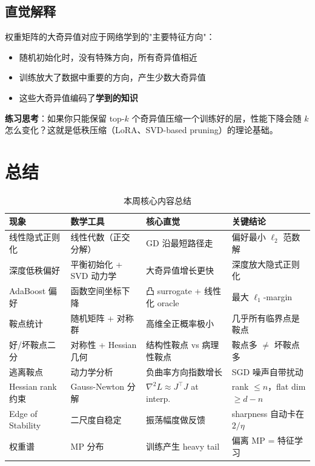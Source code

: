\documentclass[12pt, a4paper]{ctexart}
\begin{document}
\subsection{直觉解释}

\begin{insight}[奇异值与特征学习]
权重矩阵的大奇异值对应于网络学到的"主要特征方向"：

\begin{itemize}
    \item 随机初始化时，没有特殊方向，所有奇异值相近
    \item 训练放大了数据中重要的方向，产生少数大奇异值
    \item 这些大奇异值编码了\textbf{学到的知识}
\end{itemize}

\textbf{练习思考}：如果你只能保留 top-$k$ 个奇异值压缩一个训练好的层，性能下降会随 $k$ 怎么变化？这就是低秩压缩（LoRA、SVD-based pruning）的理论基础。
\end{insight}


\section{总结}

\begin{table}[h]
\centering
\caption{本周核心内容总结}
\begin{tabular}{@{}p{2.8cm}p{3.3cm}p{4cm}p{4cm}@{}}
\toprule
\textbf{现象} & \textbf{数学工具} & \textbf{核心直觉} & \textbf{关键结论} \\ \midrule
线性隐式正则化 & 线性代数（正交分解） & GD 沿最短路径走 & 偏好最小 $\ell_2$ 范数解 \\
深度低秩偏好 & 平衡初始化 + SVD 动力学 & 大奇异值增长更快 & 深度放大隐式正则化 \\
AdaBoost 偏好 & 函数空间坐标下降 & 凸 surrogate + 线性化 oracle & 最大 $\ell_1$-margin \\
鞍点统计 & 随机矩阵 + 对称群 & 高维全正概率极小 & 几乎所有临界点是鞍点 \\
好/坏鞍点二分 & 对称性 + Hessian 几何 & 结构性鞍点 vs 病理性鞍点 & 鞍点多 $\not=$ 坏鞍点多 \\
逃离鞍点 & 动力学分析 & 负曲率方向指数增长 & SGD 噪声自带扰动 \\
Hessian rank 约束 & Gauss-Newton 分解 & $\nabla^2 L \approx J^\top J$ at interp. & rank $\leq n$，flat dim $\geq d-n$ \\
Edge of Stability & 二尺度自稳定 & 振荡幅度做反馈 & sharpness 自动卡在 $2/\eta$ \\
权重谱 & MP 分布 & 训练产生 heavy tail & 偏离 MP = 特征学习 \\
\bottomrule
\end{tabular}
\end{table}
\end{document}
